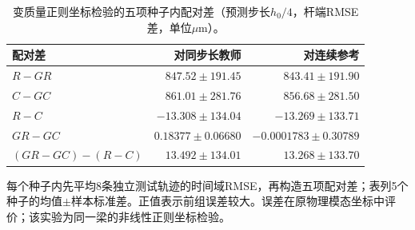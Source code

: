 \begin{table}[t]
\centering\small
\caption{变质量正则坐标检验的五项种子内配对差（预测步长$h_0/4$，杆端RMSE差，单位$\mu\mathrm m$）。}
\label{tab:variable_mass_paired}
\begin{tabular}{lrr}
\toprule
配对差 & 对同步长教师 & 对连续参考 \\
\midrule
$R-GR$ & $847.52\pm191.45$ & $843.41\pm191.90$ \\
$C-GC$ & $861.01\pm281.76$ & $856.68\pm281.50$ \\
$R-C$ & $-13.308\pm134.04$ & $-13.269\pm133.71$ \\
$GR-GC$ & $0.18377\pm0.06680$ & $-0.0001783\pm0.30789$ \\
$(GR-GC)-(R-C)$ & $13.492\pm134.01$ & $13.268\pm133.70$ \\
\bottomrule
\end{tabular}
\par\smallskip\begin{minipage}{0.96\textwidth}\footnotesize 每个种子内先平均8条独立测试轨迹的时间域RMSE，再构造五项配对差；表列5个种子的均值$\pm$样本标准差。正值表示前组误差较大。误差在原物理模态坐标中评价；该实验为同一梁的非线性正则坐标检验。\end{minipage}
\end{table}
